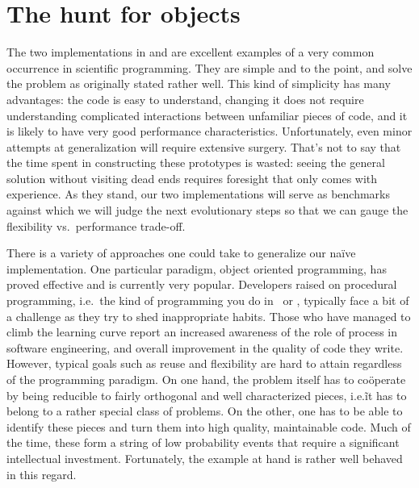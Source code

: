 %


\section{The hunt for objects}
\label{sec:classes}

The two implementations in  and  are excellent examples
of a very common occurrence in scientific programming. They are simple and to the point, and
solve the problem as originally stated rather well.  This kind of simplicity has many
advantages: the code is easy to understand, changing it does not require understanding
complicated interactions between unfamiliar pieces of code, and it is likely to have very good
performance characteristics. Unfortunately, even minor attempts at generalization will require
extensive surgery. That's not to say that the time spent in constructing these prototypes is
wasted: seeing the general solution without visiting dead ends requires foresight that only
comes with experience. As they stand, our two implementations will serve as benchmarks against
which we will judge the next evolutionary steps so that we can gauge the flexibility
vs.~performance trade-off.

There is a variety of approaches one could take to generalize our na\"ive implementation. One
particular paradigm, object oriented programming\supercite{meyer-97}, has proved effective and
is currently very popular. Developers raised on procedural programming, i.e.~the kind of
programming you do in \cc\ or \fortran, typically face a bit of a challenge as they try to shed
inappropriate habits. Those who have managed to climb the learning curve report an increased
awareness of the role of process in software engineering, and overall improvement in the
quality of code they write. However, typical goals such as reuse and flexibility are hard to
attain regardless of the programming paradigm. On one hand, the problem itself has to
co\"operate by being reducible to fairly orthogonal and well characterized pieces, i.e.\~ it
has to belong to a rather special class of problems. On the other, one has to be able to
identify these pieces and turn them into high quality, maintainable code. Much of the time,
these form a string of low probability events that require a significant intellectual
investment. Fortunately, the example at hand is rather well behaved in this regard.

